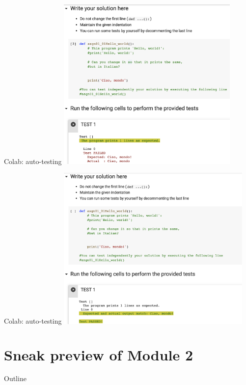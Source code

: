 \documentclass{beamer}%
\begin{document}
\begin{frame}{Colab: auto-testing}
	\centering 
	\includegraphics[width=0.67\textwidth]{figures/colab3b}
\end{frame}

\begin{frame}{Colab: auto-testing}
	\centering 
	\includegraphics[width=0.72\textwidth]{figures/colab2}
\end{frame}


\section{Sneak preview of Module 2}
\begin{frame}{Outline}
	\tableofcontents[currentsection]
\end{frame}
\end{document}
